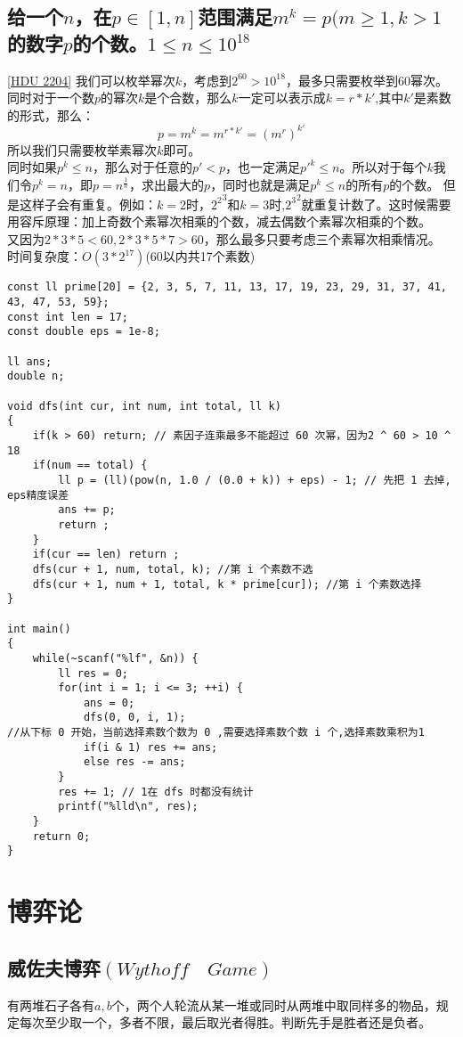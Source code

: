 \subsection{给一个$n$，在$p\in [1, n]$范围满足$m^k=p(m \geq 1, k > 1$的数字$p$的个数。$1 \leq n \leq 10^{18}$}
\underline {[HDU 2204]}
我们可以枚举幂次$k$，考虑到$2^{60}>10^{18}$，最多只需要枚举到$60$幂次。 \\
同时对于一个数$p$的幂次$k$是个合数，那么$k$一定可以表示成$k=r*k'$,其中$k'$是素数的形式，那么： \\
$$p=m^k=m^{r*k'}=(m^r)^{k'}$$
所以我们只需要枚举素幂次$k$即可。\\
同时如果$p^k \leq n$，那么对于任意的$p' < p$，也一定满足${p'}^{k} \leq n$。所以对于每个$k$我们令$p^k=n$，即$p=n^{\frac{1}{n}}$，求出最大的$p$，同时也就是满足$p^k\leq n$的所有$p$的个数。
但是这样子会有重复。例如：$k=2$时，${2^2}^3$和$k=3$时,${2^3}^{2}$就重复计数了。这时候需要用容斥原理：加上奇数个素幂次相乘的个数，减去偶数个素幂次相乘的个数。 \\
又因为$2*3*5 < 60,2*3*5*7 > 60$，那么最多只要考虑三个素幂次相乘情况。 \\
时间复杂度：$O(3*2^{17})$(60以内共17个素数)
\begin{lstlisting}
const ll prime[20] = {2, 3, 5, 7, 11, 13, 17, 19, 23, 29, 31, 37, 41, 43, 47, 53, 59};
const int len = 17;
const double eps = 1e-8;

ll ans;
double n;

void dfs(int cur, int num, int total, ll k)
{
	if(k > 60) return; // 素因子连乘最多不能超过 60 次幂，因为2 ^ 60 > 10 ^ 18
	if(num == total) {
		ll p = (ll)(pow(n, 1.0 / (0.0 + k)) + eps) - 1; // 先把 1 去掉, eps精度误差
		ans += p;
		return ;
	}
	if(cur == len) return ;
	dfs(cur + 1, num, total, k); //第 i 个素数不选
	dfs(cur + 1, num + 1, total, k * prime[cur]); //第 i 个素数选择
}

int main()
{
	while(~scanf("%lf", &n)) {
		ll res = 0;
		for(int i = 1; i <= 3; ++i) {
			ans = 0;
			dfs(0, 0, i, 1);
//从下标 0 开始，当前选择素数个数为 0 ,需要选择素数个数 i 个,选择素数乘积为1
			if(i & 1) res += ans;
			else res -= ans;
		}
		res += 1; // 1在 dfs 时都没有统计
		printf("%lld\n", res);
	}
	return 0;
}
\end{lstlisting}

\clearpage
\section{博弈论}

\subsection{威佐夫博弈$(Wythoff\quad  Game)$}
有两堆石子各有$a,b$个，两个人轮流从某一堆或同时从两堆中取同样多的物品，规定每次至少取一个，多者不限，最后取光者得胜。判断先手是胜者还是负者。 \\

